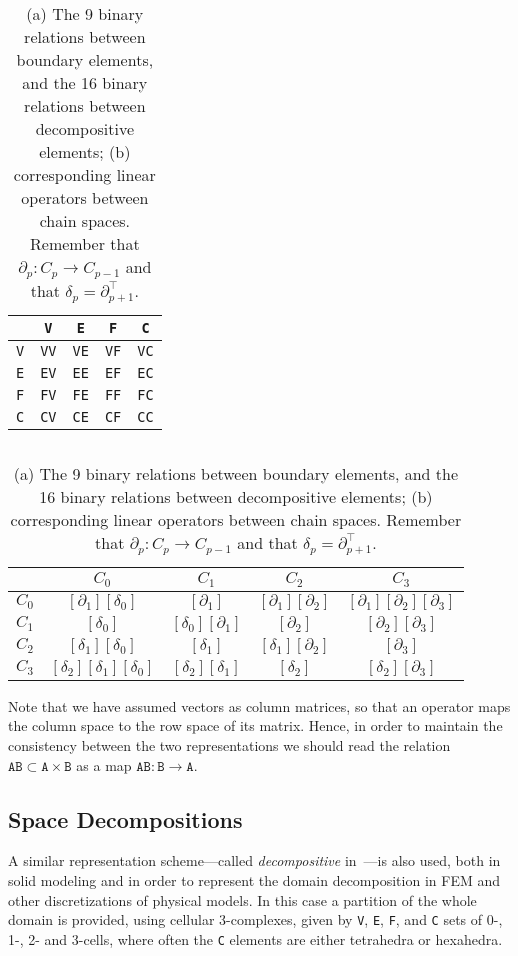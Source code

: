 \begin{table}[htp]
\caption{(a) The 9 binary relations between boundary elements, and the 16 binary relations between decompositive elements; (b) corresponding linear operators between chain spaces. Remember that $\partial_p: C_p\to C_{p-1}$ and that $\delta_p = \partial_{p+1}^\top$. }
\begin{center}
\begin{tabular}{|c|ccc|c|}
\hline
 &\texttt{V} & \texttt{E} & \texttt{F} & \texttt{C} \\ 
\hline
\texttt{V} &\texttt{VV} & \texttt{VE} & \texttt{VF} & \texttt{VC} \\ 
\texttt{E} &\texttt{EV} & \texttt{EE} & \texttt{EF} & \texttt{EC} \\ 
\texttt{F} &\texttt{FV} & \texttt{FE} & \texttt{FF} & \texttt{FC} \\ 
\hline
\texttt{C} &\texttt{CV} & \texttt{CE} & \texttt{CF} & \texttt{CC} \\ 
\hline
\end{tabular}
$\qquad$
\begin{tabular}{|c|ccc|c|}
\hline
 &\texttt{$C_0$} & \texttt{$C_1$} & \texttt{$C_2$} & \texttt{$C_3$} \\ 
\hline
\texttt{$C_0$} & $[\partial_1][\delta_0]$ & $[\partial_1]$ & $[\partial_1][\partial_2]$ & $[\partial_1][\partial_2][\partial_3]$\\ 
\texttt{$C_1$} & $[\delta_0]$  & $[\delta_0][\partial_1]$ & $[\partial_2]$ & $[\partial_2][\partial_3]$ \\ 
\texttt{$C_2$} & $[\delta_1][\delta_0]$ & $[\delta_1]$ & $[\delta_1][\partial_2]$ & $[\partial_3]$ \\ 
\hline
\texttt{$C_3$} & $[\delta_2][\delta_1][\delta_0]$ & $[\delta_2][\delta_1]$ & $[\delta_2]$ & $[\delta_2][\partial_3]$ \\ 
\hline
\end{tabular}
\end{center}
\label{tab:relations}
\end{table}%


Note that we have assumed vectors as column matrices, so that an operator maps the column space to the row space of its matrix. Hence, in order to maintain the consistency between the two representations  we should read the relation $\texttt{AB} \subset \texttt{A}\times \texttt{B}$ as a map $\texttt{AB}: \texttt{B} \to \texttt{A}$.


\subsection{Space Decompositions}\label{space-decompositions}
A similar representation scheme---called \emph{decompositive} in~\cite{Requicha:1980:RRS:356827.356833}---is also  used, both in solid modeling and in order to represent the domain decomposition in FEM and other discretizations of physical models. In this case a partition of the whole domain is provided, using cellular 3-complexes, given by \texttt{V}, \texttt{E}, \texttt{F}, and \texttt{C} sets of $0$-, 1-, 2- and 3-cells, where often the \texttt{C} elements  are either tetrahedra or hexahedra.  

